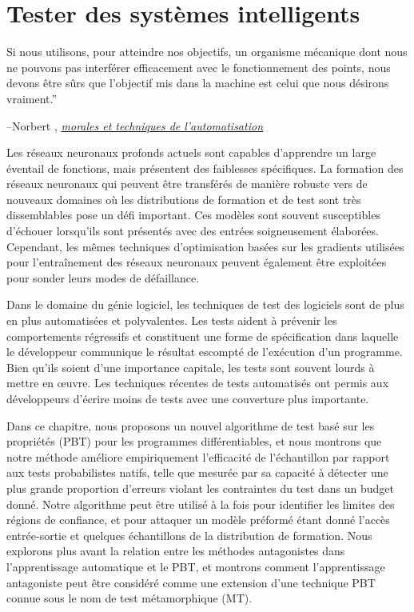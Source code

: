 \chapter{Tester des systèmes intelligents}\label{ch:difftest}

\setlength{\epigraphwidth}{0.80\textwidth}
\epigraph{Si nous utilisons, pour atteindre nos objectifs, un organisme mécanique dont nous ne pouvons pas interférer efficacement avec le fonctionnement des points, nous devons être sûrs que l'objectif mis dans la machine est celui que nous désirons vraiment.''}{\begin{flushright}--Norbert \citet{wiener1960some}, \href{https://www.ias.ac.in/article/fulltext/reso/004/01/0080-0088}{\textit{ morales et techniques de l'automatisation}}~\end{flushright}}

Les réseaux neuronaux profonds actuels sont capables d'apprendre un large éventail de fonctions, mais présentent des faiblesses spécifiques. La formation des réseaux neuronaux qui peuvent être transférés de manière robuste vers de nouveaux domaines où les distributions de formation et de test sont très dissemblables pose un défi important. Ces modèles sont souvent susceptibles d'échouer lorsqu'ils sont présentés avec des entrées soigneusement élaborées. Cependant, les mêmes techniques d'optimisation basées sur les gradients utilisées pour l'entraînement des réseaux neuronaux peuvent également être exploitées pour sonder leurs modes de défaillance.

Dans le domaine du génie logiciel, les techniques de test des logiciels sont de plus en plus automatisées et polyvalentes. Les tests aident à prévenir les comportements régressifs et constituent une forme de spécification dans laquelle le développeur communique le résultat escompté de l'exécution d'un programme. Bien qu'ils soient d'une importance capitale, les tests sont souvent lourds à mettre en œuvre. Les techniques récentes de tests automatisés ont permis aux développeurs d'écrire moins de tests avec une couverture plus importante.

Dans ce chapitre, nous proposons un nouvel algorithme de test basé sur les propriétés (PBT) pour les programmes différentiables, et nous montrons que notre méthode améliore empiriquement l'efficacité de l'échantillon par rapport aux tests probabilistes natifs, telle que mesurée par sa capacité à détecter une plus grande proportion d'erreurs violant les contraintes du test dans un budget donné. Notre algorithme peut être utilisé à la fois pour identifier les limites des régions de confiance, et pour attaquer un modèle préformé étant donné l'accès entrée-sortie et quelques échantillons de la distribution de formation. Nous explorons plus avant la relation entre les méthodes antagonistes dans l'apprentissage automatique et le PBT, et montrons comment l'apprentissage antagoniste peut être considéré comme une extension d'une technique PBT connue sous le nom de test métamorphique (MT).

